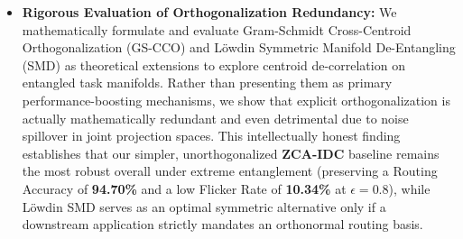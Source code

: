 \begin{itemize}
  \item \textbf{Rigorous Evaluation of Orthogonalization Redundancy:} We mathematically formulate and evaluate Gram-Schmidt Cross-Centroid Orthogonalization (GS-CCO) and L{\"o}wdin Symmetric Manifold De-Entangling (SMD) as theoretical extensions to explore centroid de-correlation on entangled task manifolds. Rather than presenting them as primary performance-boosting mechanisms, we show that explicit orthogonalization is actually mathematically redundant and even detrimental due to noise spillover in joint projection spaces. This intellectually honest finding establishes that our simpler, unorthogonalized \textbf{ZCA-IDC} baseline remains the most robust overall under extreme entanglement (preserving a Routing Accuracy of \textbf{94.70\%} and a low Flicker Rate of \textbf{10.34\%} at $\epsilon=0.8$), while L{\"o}wdin SMD serves as an optimal symmetric alternative only if a downstream application strictly mandates an orthonormal routing basis.
\end{itemize}
